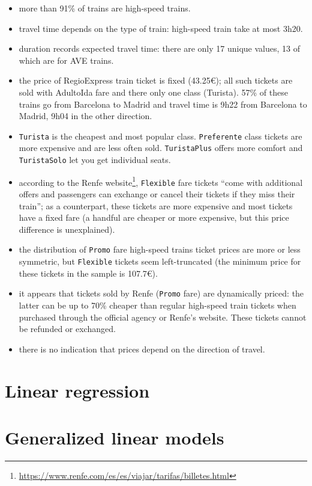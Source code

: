 \documentclass[
  11pt,
  letterpaper,
]{book}
\providecommand{\tightlist}{%
  \setlength{\itemsep}{0pt}\setlength{\parskip}{0pt}}
\renewcommand{\href}[2]{#2\footnote{\url{#1}}}
\theoremstyle{definition}
\theoremstyle{definition}
\theoremstyle{definition}
\theoremstyle{remark}
\begin{document}
\begin{itemize}
\tightlist
\item
  more than 91\% of trains are high-speed trains.
\item
  travel time depends on the type of train: high-speed train take at most 3h20.
\item
  duration records expected travel time: there are only 17 unique values, 13 of which are for AVE trains.
\item
  the price of RegioExpress train ticket is fixed (43.25€); all such tickets are sold with AdultoIda fare and there only one class (Turista). 57\% of these trains go from Barcelona to Madrid and travel time is 9h22 from Barcelona to Madrid, 9h04 in the other direction.
\item
  \texttt{Turista} is the cheapest and most popular class. \texttt{Preferente} class tickets are more expensive and are less often sold. \texttt{TuristaPlus} offers more comfort and \texttt{TuristaSolo} let you get individual seats.
\item
  according to the \href{https://www.renfe.com/es/es/viajar/tarifas/billetes.html}{Renfe website}, \texttt{Flexible} fare tickets ``come with additional offers and passengers can exchange or cancel their tickets if they miss their train''; as a counterpart, these tickets are more expensive and most tickets have a fixed fare (a handful are cheaper or more expensive, but this price difference is unexplained).
\item
  the distribution of \texttt{Promo} fare high-speed trains ticket prices are more or less symmetric, but \texttt{Flexible} tickets seem left-truncated (the minimum price for these tickets in the sample is 107.7€).
\item
  it appears that tickets sold by Renfe (\texttt{Promo} fare) are dynamically priced: the latter can be up to 70\% cheaper than regular high-speed train tickets when purchased through the official agency or Renfe's website. These tickets cannot be refunded or exchanged.
\item
  there is no indication that prices depend on the direction of travel.
\end{itemize}

\hypertarget{linear-regression}{%
\chapter{Linear regression}\label{linear-regression}}

\hypertarget{generalized-linear-models}{%
\chapter{Generalized linear models}\label{generalized-linear-models}}
\end{document}
